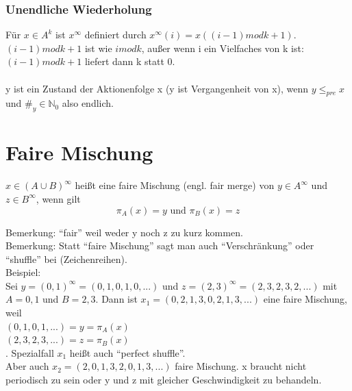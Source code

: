 \subsubsection*{Unendliche Wiederholung}
Für $x \in A^k$ ist \emph{$x^{\infty}$} definiert durch $x^{\infty}(i) = x((i-1)mod k + 1)$.\\
$(i-1)mod k + 1$ ist wie $i mod k$, außer wenn i ein Vielfaches von k ist:\\
$(i-1)mod k + 1$ liefert dann k statt 0.\\
\\
y ist ein Zustand der Aktionenfolge x (y ist Vergangenheit von x), wenn $y \leq_{pre} x$ und $\#_y \in \mathbb{N}_0$ also endlich.

\section{Faire Mischung}
$x \in (A \cup B)^\infty$ heißt eine faire Mischung (engl. fair merge) von $y \in A^\infty$ und $z \in B^\infty$, wenn gilt
\begin{equation*}
\pi_A(x) = y \text{ und } \pi_B(x) = z
\end{equation*}

Bemerkung: "`fair"' weil weder y noch z zu kurz kommen.\\
Bemerkung: Statt "`faire Mischung"' sagt man auch "`Verschränkung"' oder "`shuffle"' bei (Zeichenreihen).\\

Beispiel:\\
Sei $y = (0, 1)^\infty = (0, 1, 0, 1, 0, ...)$ und $z = (2,3)^\infty = (2, 3, 2, 3, 2, ...)$ mit $A = {0, 1}$ und $B = {2, 3}$. Dann ist $x_1 = (0, 2, 1, 3, 0, 2, 1, 3, ...)$ eine faire Mischung, weil \\
$(0,  1,  0,  1, ...) = y = \pi_A(x)$\\
$(2, 3, 2, 3, ...) = z = \pi_B(x)$\\.
Spezialfall $x_1$ heißt auch "`perfect shuffle"'.\\

Aber auch $x_2 = (2, 0, 1, 3, 2, 0, 1, 3, ...)$ faire Mischung. x braucht nicht periodisch zu sein oder y und z mit gleicher Geschwindigkeit zu behandeln.

